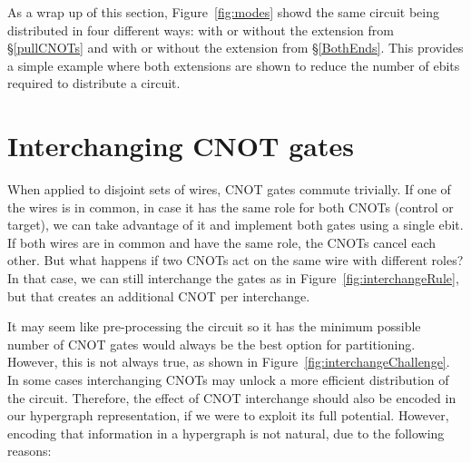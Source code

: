 
As a wrap up of this section, Figure~\ref{fig:modes} showd the same circuit being distributed in four different ways: with or without the extension from \S\ref{pullCNOTs} and with or without the extension from \S\ref{BothEnds}. This provides a simple example where both extensions are shown to reduce the number of ebits required to distribute a circuit.



\section{Interchanging CNOT gates}

When applied to disjoint sets of wires, CNOT gates commute trivially. If one of the wires is in common, in case it has the same role for both CNOTs (control or target), we can take advantage of it and implement both gates using a single ebit. If both wires are in common and have the same role, the CNOTs cancel each other. But what happens if two CNOTs act on the same wire with different roles? In that case, we can still interchange the gates as in Figure~\ref{fig:interchangeRule}, but that creates an additional CNOT per interchange.





It may seem like pre-processing the circuit so it has the minimum possible number of CNOT gates would always be the best option for partitioning. However, this is not always true, as shown in Figure~\ref{fig:interchangeChallenge}. In some cases interchanging CNOTs may unlock a more efficient distribution of the circuit. Therefore, the effect of CNOT interchange should also be encoded in our hypergraph representation, if we were to exploit its full potential. However, encoding that information in a hypergraph is not natural, due to the following reasons:


